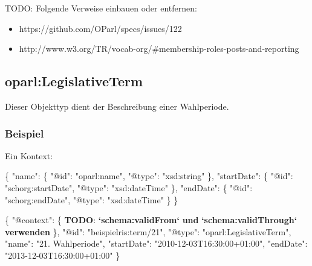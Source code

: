 \documentclass[,a4paper]{article}
\newenvironment{Shaded}{}{}
\newcommand{\DataTypeTok}[1]{\textcolor[rgb]{0.56,0.13,0.00}{{#1}}}
\newcommand{\StringTok}[1]{\textcolor[rgb]{0.25,0.44,0.63}{{#1}}}
\newcommand{\FunctionTok}[1]{\textcolor[rgb]{0.02,0.16,0.49}{{#1}}}
\newcommand{\ErrorTok}[1]{\textcolor[rgb]{1.00,0.00,0.00}{\textbf{{#1}}}}
\begin{document}
TODO: Folgende Verweise einbauen oder entfernen:

\begin{itemize}
\itemsep1pt\parskip0pt
\item
  https://github.com/OParl/specs/issues/122
\item
  http://www.w3.org/TR/vocab-org/\#membership-roles-posts-and-reporting
\end{itemize}

\subsection{oparl:LegislativeTerm}\label{oparlux5flegislativeux5fterm}

Dieser Objekttyp dient der Beschreibung einer Wahlperiode.

\subsubsection{Beispiel}\label{beispiel-11}

Ein Kontext:

\begin{Shaded}
\begin{Highlighting}[]
\FunctionTok{\{}
    \DataTypeTok{"name"}\FunctionTok{:} \FunctionTok{\{}
        \DataTypeTok{"@id"}\FunctionTok{:} \StringTok{"oparl:name"}\FunctionTok{,}
        \DataTypeTok{"@type"}\FunctionTok{:} \StringTok{"xsd:string"}
    \FunctionTok{\},}
    \DataTypeTok{"startDate"}\FunctionTok{:} \FunctionTok{\{}
        \DataTypeTok{"@id"}\FunctionTok{:} \StringTok{"schorg:startDate"}\FunctionTok{,}
        \DataTypeTok{"@type"}\FunctionTok{:} \StringTok{"xsd:dateTime"}
    \FunctionTok{\},}
    \DataTypeTok{"endDate"}\FunctionTok{:} \FunctionTok{\{}
        \DataTypeTok{"@id"}\FunctionTok{:} \StringTok{"schorg:endDate"}\FunctionTok{,}
        \DataTypeTok{"@type"}\FunctionTok{:} \StringTok{"xsd:dateTime"}
    \FunctionTok{\}}   
\FunctionTok{\}}
\end{Highlighting}
\end{Shaded}

\begin{Shaded}
\begin{Highlighting}[]
\FunctionTok{\{}
    \DataTypeTok{"@context"}\FunctionTok{:} \FunctionTok{\{}
        \ErrorTok{TODO}\FunctionTok{:} \ErrorTok{`schema:validFrom`} \ErrorTok{und} \ErrorTok{`schema:validThrough`} \ErrorTok{verwenden}
    \FunctionTok{\},}
    \DataTypeTok{"@id"}\FunctionTok{:} \StringTok{"beispielris:term/21"}\FunctionTok{,}
    \DataTypeTok{"@type"}\FunctionTok{:} \StringTok{"oparl:LegislativeTerm"}\FunctionTok{,}
    \DataTypeTok{"name"}\FunctionTok{:} \StringTok{"21. Wahlperiode"}\FunctionTok{,}
    \DataTypeTok{"startDate"}\FunctionTok{:} \StringTok{"2010-12-03T16:30:00+01:00"}\FunctionTok{,}
    \DataTypeTok{"endDate"}\FunctionTok{:}  \StringTok{"2013-12-03T16:30:00+01:00"}
\FunctionTok{\}}
\end{Highlighting}
\end{Shaded}
\end{document}
